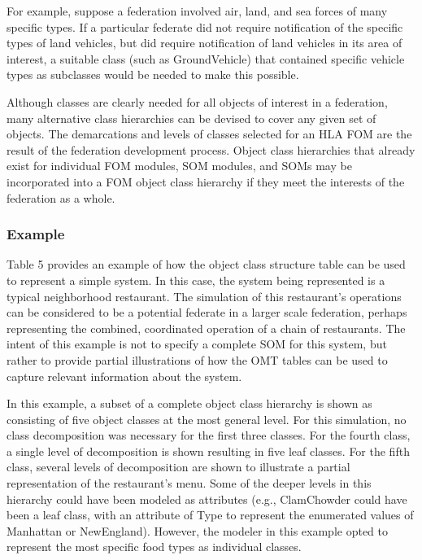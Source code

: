 For example, suppose a federation involved air, land, and sea forces of many specific types. If a particular federate did not require notification of the specific types of land vehicles, but did require notification of land vehicles in its area of interest, a suitable class (such as GroundVehicle) that contained specific vehicle types as subclasses would be needed to make this possible.

Although classes are clearly needed for all objects of interest in a federation, many alternative class hierarchies can be devised to cover any given set of objects. The demarcations and levels of classes selected for an HLA FOM are the result of the federation development process. Object class hierarchies that already exist for individual FOM modules, SOM modules, and SOMs may be incorporated into a FOM object class hierarchy if they meet the interests of the federation as a whole.

\subsubsection{Example}
Table 5 provides an example of how the object class structure table can be used to represent a simple system. In this case, the system being represented is a typical neighborhood restaurant. The simulation of this restaurant's operations can be considered to be a potential federate in a larger scale federation, perhaps representing the combined, coordinated operation of a chain of restaurants. The intent of this example is not to specify a complete SOM for this system, but rather to provide partial illustrations of how the OMT tables can be used to capture relevant information about the system.

In this example, a subset of a complete object class hierarchy is shown as consisting of five object classes at the most general level. For this simulation, no class decomposition was necessary for the first three classes. For the fourth class, a single level of decomposition is shown resulting in five leaf classes. For the fifth class, several levels of decomposition are shown to illustrate a partial representation of the restaurant's menu. Some of the deeper levels in this hierarchy could have been modeled as attributes (e.g., ClamChowder could have been a leaf class, with an attribute of Type to represent the enumerated values of Manhattan or NewEngland). However, the modeler in this example opted to represent the most specific food types as individual classes.

